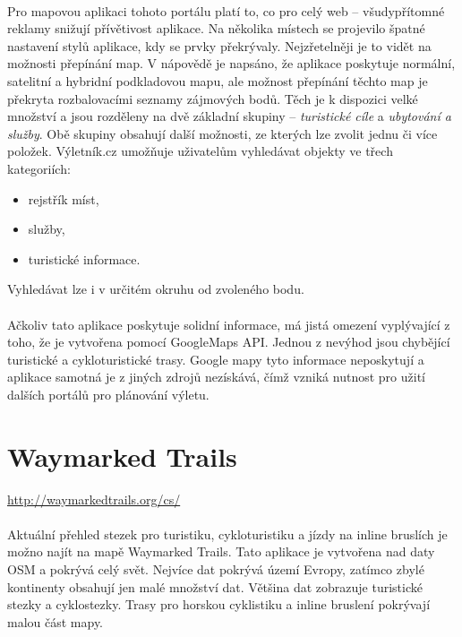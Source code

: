 \documentclass[11pt,a4paper,titlepage,oneside]{book}
\begin{document}
		\paragraph{} Pro mapovou aplikaci tohoto portálu platí to, co pro celý web -- všudy\-přítomné reklamy snižují přívětivost aplikace. Na několika místech se projevilo špatné nastavení stylů aplikace, kdy se prvky překrývaly. Nejzřetelněji je to vidět na možnosti přepínání map. V nápovědě\cite{vyletnik} je napsáno, že aplikace poskytuje normální, satelitní a hybridní podkladovou mapu, ale možnost přepínání těchto map je překryta rozbalovacími seznamy zájmových bodů. Těch je k dispozici velké množství a jsou rozděleny na dvě základní skupiny -- \textit{turistické cíle} a \textit{ubytování a služby}. Obě skupiny obsahují další možnosti, ze kterých lze zvolit jednu či více položek. Výletník.cz umožňuje uživatelům vyhledávat objekty ve třech kategoriích:
			\begin{itemize}
				\item rejstřík míst,
				\item služby,
				\item turistické informace.
			\end{itemize}
Vyhledávat lze i v určitém okruhu od zvoleného bodu.
		\paragraph{} Ačkoliv tato aplikace poskytuje solidní informace, má jistá omezení vyplý\-vající z toho, že je vytvořena pomocí GoogleMaps \ac{API}. Jednou z nevýhod jsou chybějící turistické a cykloturistické trasy. Google mapy tyto informace neposkytují a aplikace samotná je z jiných zdrojů nezískává, čímž vzniká nutnost pro užití dalších portálů pro plánování výletu.	
	
	\section{Waymarked Trails}
		\label{sec:waymarked}
		\url{http://waymarkedtrails.org/cs/}


		\paragraph{} Aktuální přehled stezek pro turistiku, cykloturistiku a jízdy na inline bruslích je možno najít na mapě Waymarked Trails\cite{Waymarked}. Tato aplikace je vytvořena nad daty \ac{OSM} a pokrývá celý svět. Nejvíce dat pokrývá území Evropy, zatímco zbylé kontinenty  obsahují jen malé množství dat. Většina dat zobrazuje turistické stezky a cyklostezky. Trasy pro horskou cyklistiku a inline bruslení pokrývají malou část mapy.
\end{document}
